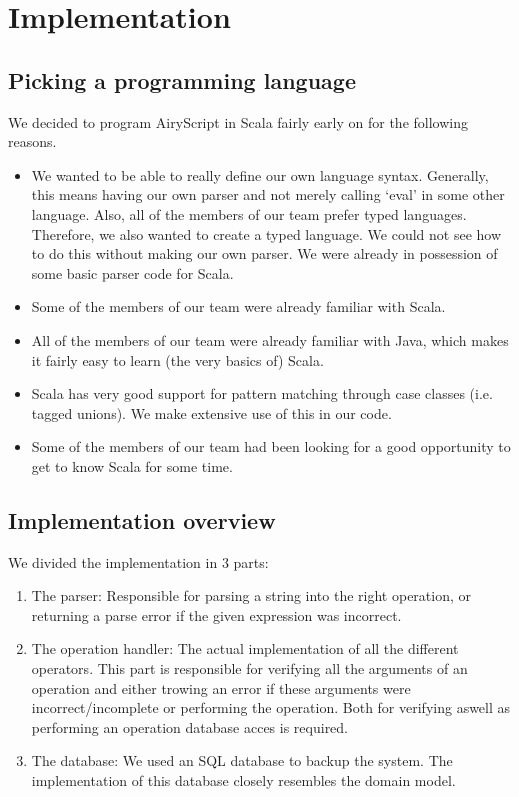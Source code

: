 \section{Implementation}

\subsection{Picking a programming language}
We decided to program AiryScript in Scala fairly early on for the following
reasons.
\begin{itemize}
  \item We wanted to be able to really define our own language syntax.
    Generally, this means having our own parser and not merely calling ‘eval’ in
    some other language. Also, all of the members of our team prefer typed
    languages. Therefore, we also wanted to create a typed language. We could
    not see how to do this without making our own parser. We were already in
    possession of some basic parser code for Scala.
  \item Some of the members of our team were already familiar with Scala.
  \item All of the members of our team were already familiar with Java, which
    makes it fairly easy to learn (the very basics of) Scala.
  \item Scala has very good support for pattern matching through case classes
    (i.e. tagged unions). We make extensive use of this in our code.
  \item Some of the members of our team had been looking for a good opportunity
    to get to know Scala for some time.
\end{itemize}


\subsection{Implementation overview}

We divided the implementation in 3 parts:
\begin{enumerate}
\item The parser: Responsible for parsing a string into the right operation, or
returning a parse error if the given expression was incorrect.
\item The operation handler: The actual implementation of all the different
operators. This part is responsible for verifying all the arguments of an
operation and either trowing an error if these arguments were
incorrect/incomplete or performing the operation. Both for verifying aswell as
performing an operation database acces is required.
\item The database: We used an SQL database to backup the system. The
implementation of this database closely resembles the domain model.
\end{enumerate} 
	
